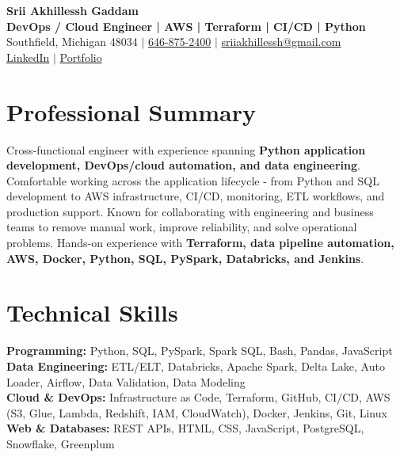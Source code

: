 \documentclass[letterpaper,10pt]{article}
\begin{document}
\fontsize{9.35pt}{10.45pt}\selectfont

\begin{center}
    {\LARGE \textbf{Srii Akhillessh Gaddam}} \\[-1pt]
    \textbf{DevOps / Cloud Engineer | AWS | Terraform | CI/CD | Python} \\[2pt]
    Southfield, Michigan 48034 $|$
    \href{tel:6468752400}{646-875-2400} $|$
    \href{mailto:sriiakhillessh@gmail.com}{sriiakhillessh@gmail.com} \\[1pt]
    \href{https://www.linkedin.com/in/srii-akhiilessh-gaddam-b48668191/}{LinkedIn} $|$
    \href{https://sriiakhillesshg.github.io/portfolio/}{Portfolio}
\end{center}
\vspace{-8pt}

\section{Professional Summary}
\small{Cross-functional engineer with experience spanning \textbf{Python application development, DevOps/cloud automation, and data engineering}. Comfortable working across the application lifecycle - from Python and SQL development to AWS infrastructure, CI/CD, monitoring, ETL workflows, and production support. Known for collaborating with engineering and business teams to remove manual work, improve reliability, and solve operational problems. Hands-on experience with \textbf{Terraform, data pipeline automation, AWS, Docker, Python, SQL, PySpark, Databricks, and Jenkins}.}

\section{Technical Skills}
\small{
\textbf{Programming:} Python, SQL, PySpark, Spark SQL, Bash, Pandas, JavaScript \\
\textbf{Data Engineering:} ETL/ELT, Databricks, Apache Spark, Delta Lake, Auto Loader, Airflow, Data Validation, Data Modeling \\
\textbf{Cloud \& DevOps:} Infrastructure as Code, Terraform, GitHub, CI/CD, AWS (S3, Glue, Lambda, Redshift, IAM, CloudWatch), Docker, Jenkins, Git, Linux \\
\textbf{Web \& Databases:} REST APIs, HTML, CSS, JavaScript, PostgreSQL, Snowflake, Greenplum
}
\end{document}

